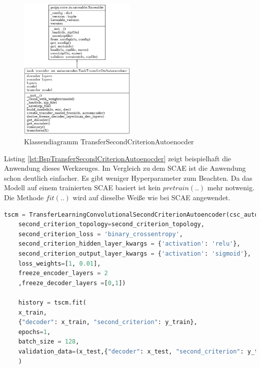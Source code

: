 	\begin{figure}[h]
		\centering
		\includegraphics[width=0.5\textwidth, center]{bilder/Klassendiagramme/TTAE.png}
		\caption[Klassendiagramm TransferSecondCriterionAutoenocder]{Klassendiagramm TransferSecondCriterionAutoenocder}
		\label{img:KlassendiagrammTransferSecondCriterionAutoenocder}
	\end{figure}  
	Listing \ref{lst:BspTransferSecondCriterionAutoenocder} zeigt beispielhaft die Anwendung dieses Werkzeuges. Im Vergleich zu dem SCAE ist die Anwendung schon deutlich einfacher. Es gibt weniger Hyperparameter zum Beachten. Da das Modell auf einem trainierten SCAE basiert ist kein $pretrain(..)$ mehr notwenig. Die Methode $fit(..)$ wird auf dieselbe Weiße wie bei SCAE angewendet.	
	
	
	\begin{lstlisting}[language=python,caption=Beispiel TransferSecondCriterionAutoenocder in Python, label=lst:BspTransferSecondCriterionAutoenocder]
	tscm = TransferLearningConvolutionalSecondCriterionAutoencoder(csc_autoencoder,
	second_criterion_topology=second_criterion_topology,
	second_criterion_loss = 'binary_crossentropy',                                                                                                   
	second_criterion_hidden_layer_kwargs = {'activation': 'relu'},
	second_criterion_output_layer_kwargs = {'activation': 'sigmoid'}, 
	loss_weights=[1, 0.01],
	freeze_encoder_layers = 2
	,freeze_decoder_layers =[0,1])
	
	history = tscm.fit(
	x_train,
	{"decoder": x_train, "second_criterion": y_train}, 
	epochs=1,
	batch_size = 128,
	validation_data=(x_test,{"decoder": x_test, "second_criterion": y_test}))
	)
	\end{lstlisting}	
		
